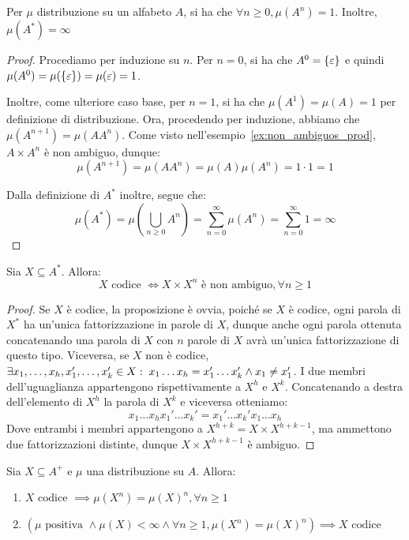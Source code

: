 \begin{proposition}[label=prop:A_power_mesure_1]{}
  Per \(\mu\) distribuzione su un alfabeto \(A\), si ha che \(\forall n \geq 0, \mu(A^n) = 1\).
  Inoltre, \(\mu(A^*) = \infty\)
\end{proposition}
\begin{proof}
  Procediamo per induzione su \(n\).
  Per \(n=0\), si ha che \(A^0 = \set{\varepsilon}\) e quindi \(\mu(A^0) = \mu(\set{\varepsilon}) = \mu(\varepsilon) = 1\).

  Inoltre, come ulteriore caso base, per \(n=1\), si ha che \(\mu(A^1) = \mu(A) = 1\) per definizione di distribuzione.
  Ora, procedendo per induzione, abbiamo che \(\mu(A^{n+1}) = \mu(AA^n)\).
  Come visto nell'esempio~\ref{ex:non_ambiguos_prod}, \(A \times A^n\) è non ambiguo, dunque:
  \[\mu(A^{n+1}) = \mu(AA^n) = \mu(A)\mu(A^n) = 1 \cdot 1 = 1 \]

  Dalla definizione di \(A^*\) inoltre, segue che:
  \[\mu(A^*) = \mu(\bigcup_{n\geq0} A^n) = \sum_{n=0}^{\infty} \mu(A^n) = \sum_{n=0}^{\infty} 1 = \infty\]
\end{proof}

\begin{proposition}[label=prop:code_iff_not_ambiguos]{}
  Sia \(X \subseteq A^*\). Allora:
  \[X \text{ codice } \iff X\times X^n \text{ è non ambiguo},\forall n \geq 1\]
\end{proposition}
\begin{proof}
  Se \(X\) è codice, la proposizione è ovvia, poiché se \(X\) è codice, ogni parola di \(X^*\) ha un'unica fattorizzazione in parole di \(X\), dunque anche ogni parola ottenuta concatenando una parola di \(X\) con \(n\) parole di \(X\) avrà un'unica fattorizzazione di questo tipo.
  Viceversa, se \(X\) non è codice, \(\exists x_1,\ldots,x_h,x_1',\ldots,x_k' \in X :\; x_1\ldots x_h = x_1'\ldots x_k' \land x_1 \neq x_1'\).
  I due membri dell'uguaglianza appartengono rispettivamente a \(X^h\) e \(X^k\).
  Concatenando a destra dell'elemento di \(X^h\) la parola di \(X^k\) e viceversa otteniamo:
  \[x_1\ldots x_h x_1'\ldots x_k' = x_1'\ldots x_k' x_1\ldots x_h\]
  Dove entrambi i membri appartengono a \(X^{h+k} = X \times X^{h+k-1}\), ma ammettono due fattorizzazioni distinte, dunque \(X \times X^{h+k-1}\) è ambiguo.
\end{proof}

\begin{proposition}[label=prop:code_implies_equal_mesures_of_powers]{}
  Sia \(X \subseteq A^+\) e \(\mu\) una distribuzione su \(A\). Allora:
  \begin{enumerate}
    \item \(X \text{ codice } \implies \mu(X^n) = {\mu(X)}^n, \forall n \geq 1\)\label{item:code_implies_measure_product}
    \item \((\mu \text{ positiva } \land \mu(X) < \infty \land \forall n \geq 1, \mu(X^n) = {\mu(X)}^n )\implies X \text{ codice}\)\label{item:measure_product_implies_code}
  \end{enumerate}
\end{proposition}

